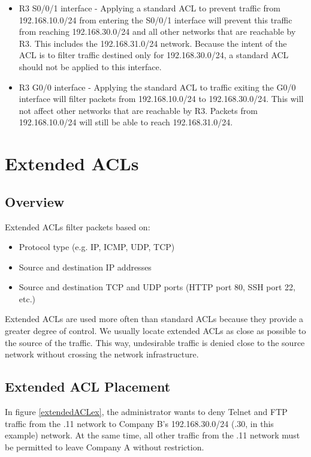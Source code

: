 \begin{itemize}
\item R3 S0/0/1 interface - Applying a standard ACL to prevent traffic from 192.168.10.0/24 from entering the S0/0/1 interface will prevent this traffic from reaching 192.168.30.0/24 and all other networks that are reachable by R3. This includes the 192.168.31.0/24 network. Because the intent of the ACL is to filter traffic destined only for 192.168.30.0/24, a standard ACL should not be applied to this interface.

\item R3 G0/0 interface - Applying the standard ACL to traffic exiting the G0/0 interface will filter packets from 192.168.10.0/24 to 192.168.30.0/24. This will not affect other networks that are reachable by R3. Packets from 192.168.10.0/24 will still be able to reach 192.168.31.0/24.
\end{itemize}

\section{Extended ACLs}

\subsection{Overview}

Extended ACLs filter packets based on:

\begin{itemize}
\item Protocol type (e.g. IP, ICMP, UDP, TCP)
\item Source and destination IP addresses
\item Source and destination TCP and UDP ports (HTTP port 80, SSH port 22, etc.)
\end{itemize}

Extended ACLs are used more often than standard ACLs because they provide a greater degree of control. We usually locate extended ACLs as close as possible to the source of the traffic. This way, undesirable traffic is denied close to the source network without crossing the network infrastructure.

\subsection{Extended ACL Placement}

In figure \ref{extendedACLex}, the administrator wants to deny Telnet and FTP traffic from the .11 network to Company B's 192.168.30.0/24 (.30, in this example) network. At the same time, all other traffic from the .11 network must be permitted to leave Company A without restriction.\\

